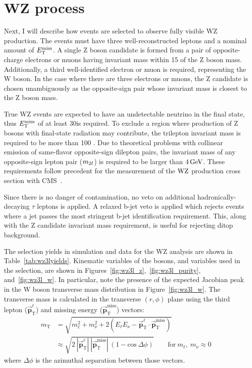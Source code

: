 \section{WZ process}
\label{sec:wz3l}
Next, I will describe how events are selected to observe fully visible WZ production. 
The events must have three well-reconstructed leptons and a nominal amount of $E_\mathrm{T}^{\mathrm{miss}}$.
A single Z boson candidate is formed from a pair of opposite-charge electrons or muons having invariant mass within 15 \GeV of the Z boson mass.
Additionally, a third well-identified electron or muon is required, representing the W boson.
In the case where there are three electrons or muons,
the Z candidate is chosen unambiguously as the opposite-sign pair whose invariant mass is closest to the Z boson mass.

True WZ events are expected to have an undetectable neutrino in the final state, thus $E_\mathrm{T}^{\mathrm{miss}}$ of at least 30\GeV is required.
To exclude a region where production of Z bosons with final-state radiation may contribute, the trilepton invariant mass is required to be more than 100 \GeV.
Due to theoretical problems with collinear emission of same-flavor opposite-sign dilepton pairs, the invariant mass of any opposite-sign lepton pair ($m_{2\ell}$) is required to be larger than $4\,\text{Ge\hspace{-.08em}V}$.
These requirements follow precedent for the measurement of the $\mathrm{W}\mathrm{Z}$ production cross section with CMS~\cite{Khachatryan:2016tgp}.

Since there is no danger of contamination, no veto on additional hadronically-decaying $\tau$ leptons is applied.
A relaxed b-jet veto is applied which rejects events where a jet passes the most stringent b-jet identification requirement.
This, along with the Z candidate invariant mass requirement, is useful for rejecting ditop background.

The selection yields in simulation and data for the WZ analysis are shown in Table~\ref{tab:wz3lyields}.
Kinematic variables of the bosons, and variables used in the selection, are shown in Figures~\ref{fig:wz3l_z},~\ref{fig:wz3l_purity}, and~\ref{fig:wz3l_w}.
In particular, note the presence of the expected Jacobian peak in the W boson transverse mass distribution in Figure~\ref{fig:wz3l_w}.
The transverse mass is calculated in the transverse $(r,\phi)$ plane using the 
third lepton ($\vec{\mathbf{p}}_\mathrm{T}^\ell$) and missing energy ($\vec{\mathbf{p}}_\mathrm{T}^\mathrm{miss}$) vectors:
\begin{equation}
\label{eq:mt}
\begin{split}
m_\mathrm{T} & = \sqrt{m_\ell^2 + m_\nu^2 + 2(E_\ell E_\nu -\vec{\mathbf{p}}_\mathrm{T}^\ell \cdot \vec{\mathbf{p}}_\mathrm{T}^\mathrm{miss})} \\ 
& \approx \sqrt{2\:|\vec{\mathbf{p}}_\mathrm{T}^\ell|\:|\vec{\mathbf{p}}_\mathrm{T}^\mathrm{miss}|\:(1 - \mathrm{cos}\:\Delta\phi)} \qquad \mathrm{for}\:m_\ell,\:m_\nu\approx0
\end{split}
\end{equation}
where $\Delta\phi$ is the azimuthal separation between those vectors.

